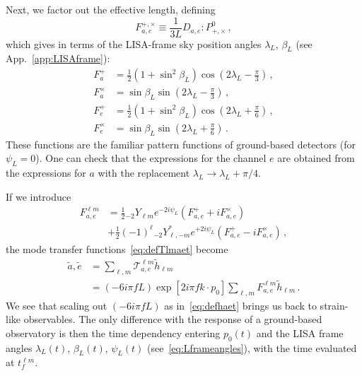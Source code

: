 \documentclass[aps,showpacs,twocolumn,prd,superscriptaddress,nofootinbib]{revtex4-1}
\newcommand{\be}{\begin{equation}}
\newcommand{\ee}{\end{equation}}
\newcommand{\bsub}{\begin{subequations}}
\newcommand{\esub}{\end{subequations}}
\newcommand\calT{{\mathcal{T}}}
\newcommand{\nn}{\nonumber}
\newcommand\betaL{{\beta_{L}}}
\newcommand\lambdaL{{\lambda_{L}}}
\newcommand{\sYlm}{{}_{-2}Y_{\ell m}}
\newcommand{\sYlminusmstar}{{}_{-2}Y_{\ell, -m}^{*}}
\begin{document}
Next, we factor out the effective length, defining
\be\label{eq:defFapcFepc}
	F_{a,e}^{+,\times} \equiv \frac{1}{3L} D_{a,e} : P_{+,\times}^{0} \,,
\ee
which gives in terms of the LISA-frame sky position angles $\lambdaL$, $\betaL$ (see App.~\ref{app:LISAframe}):
\bsub\label{eq:FapcFepc}
\begin{align}
	F_{a}^{+} &= \frac{1}{2} \left( 1 + \sin^{2}\beta_{L} \right) \cos \left(2\lambda_{L} - \frac{\pi}{3} \right) \,,\\
	F_{a}^{\times} &= \sin\beta_{L} \sin \left(2\lambda_{L} - \frac{\pi}{3} \right) \,,\\
	F_{e}^{+} &= \frac{1}{2} \left( 1 + \sin^{2}\beta_{L} \right) \cos \left(2\lambda_{L} + \frac{\pi}{6} \right) \,,\\
	F_{e}^{\times} &= \sin\beta_{L} \sin \left(2\lambda_{L} + \frac{\pi}{6} \right)  \,.
\end{align}
\esub
These functions are the familiar pattern functions of ground-based detectors (for $\psi_{L}=0$).
One can check that the expressions for the channel $e$ are obtained from the expressions for $a$ with the replacement $\lambdaL \rightarrow \lambdaL + \pi/4$.

If we introduce
\begin{align}\label{eq:Flmae}
	F_{a,e}^{\ell m} &= \frac{1}{2} \sYlm e^{-2 i \psi_{L}} \left( F_{a,e}^{+} + i F_{a,e}^{\times}\right) \nn\\
	& + \frac{1}{2} (-1)^{\ell} \sYlminusmstar e^{+2 i \psi_{L}} \left( F_{a,e}^{+} - i F_{a,e}^{\times} \right) \,,
\end{align}
the mode transfer functions~\eqref{eq:defTlmaet} become
\begin{align}\label{eq:transferlowfae}
	\tilde{a}, \tilde{e} &= \sum_{\ell,m} \calT^{\ell m}_{a,e} \tilde{h}_{\ell m} \nn\\
	&= \left(-6 i \pi f L\right) \exp[2i \pi f k\cdot p_{0}] \sum_{\ell,m} F_{a,e}^{\ell m} \tilde{h}_{\ell m}\,.
\end{align}
We see that scaling out $(-6 i \pi fL)$ as in~\eqref{eq:defhaet} brings us back to strain-like observables. The only difference with the response of a ground-based observatory is then the time dependency entering $p_{0}(t)$ and the LISA frame angles $\lambda_{L}(t)$, $\beta_{L}(t)$, $\psi_{L}(t)$ (see~\eqref{eq:Lframeangles}), with the time evaluated at $t_{f}^{\ell m}$.
\end{document}
